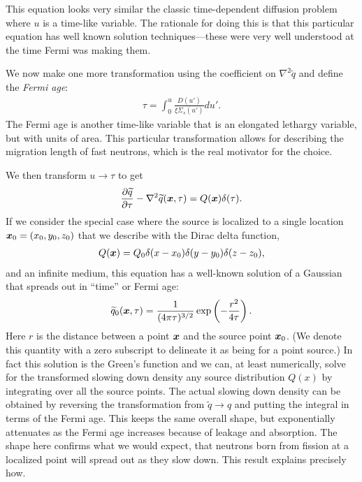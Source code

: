 This equation looks very similar the classic time-dependent diffusion problem where $u$ is a time-like variable. The rationale for doing this is that this particular equation has well known solution techniques---these were very well understood at the time Fermi was making them.

We now make one more transformation using the coefficient on $\nabla^2 \widetilde{q}$ and define the \emph{Fermi age}:
\begin{align}
  \tau = \int_0^u \frac{D(u')}{\xi\Sigma_s(u')} du' .
\end{align}
The Fermi age is another time-like variable that is an elongated lethargy variable, but with units of area. This particular transformation allows for describing the migration length of fast neutrons, which is the real motivator for the choice.

We then transform $u \rightarrow \tau$ to get
\begin{align}
  \frac{ \partial {\widetilde{q}} }{ \partial {\tau} } - \nabla^2 \widetilde{q}(\bm{x},\tau) = Q(\bm{x}) \delta(\tau) .
\end{align}
If we consider the special case where the source is localized to a single location $\bm{x}_0 = (x_0,y_0,z_0)$ that we describe with the Dirac delta function,
\begin{align}
  Q(\bm{x}) = Q_0 \delta( x - x_0 ) \delta( y - y_0 ) \delta( z - z_0 ),
\end{align}
and an infinite medium, this equation has a well-known solution of a Gaussian that spreads out in ``time'' or Fermi age:
\begin{align}
  \widetilde{q}_0(\bm{x},\tau) = \frac{1}{(4 \pi \tau)^{3/2}} \exp\left( -\frac{r^2}{4\tau} \right) .
\end{align}
Here $r$ is the distance between a point $\bm{x}$ and the source point $\bm{x}_0$. (We denote this quantity with a zero subscript to delineate it as being for a point source.) In fact this solution is the Green's function and we can, at least numerically, solve for the transformed slowing down density any source distribution $Q(x)$ by integrating over all the source points. The actual slowing down density can be obtained by reversing the transformation from $\widetilde{q} \rightarrow q$ and putting the integral in terms of the Fermi age. This keeps the same overall shape, but exponentially attenuates as the Fermi age increases because of leakage and absorption. The shape here confirms what we would expect, that neutrons born from fission at a localized point will spread out as they slow down. This result explains precisely how.

